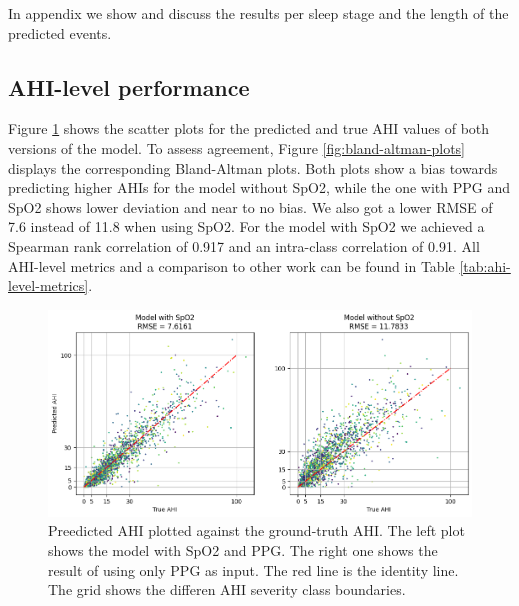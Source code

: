 In appendix  we show and discuss the results per sleep stage and the length of the predicted events.

\subsection*{AHI-level performance}

Figure \ref{fig:ahi-plots} shows the scatter plots for the predicted and true AHI values of both versions of the model. To assess agreement, Figure \ref{fig:bland-altman-plots} displays the corresponding Bland-Altman plots. Both plots show a bias towards predicting higher AHIs for the model without SpO2, while the one with PPG and SpO2 shows lower deviation and near to no bias. We also got a lower RMSE of 7.6 instead of 11.8 when using SpO2.
For the model with SpO2 we achieved a Spearman rank correlation of 0.917 and an intra-class correlation of  0.91.
All AHI-level metrics and a comparison to other work can be found in Table \ref{tab:ahi-level-metrics}.

\begin{figure}
    \centering
    \includegraphics[width=\textwidth]{images/AhiPlots}
    \caption{Preedicted AHI plotted against the ground-truth AHI. The left plot shows the model with SpO2 and PPG. The right one shows the result of using only PPG as input. The red line is the identity line. The grid shows the differen AHI severity class boundaries.}
    \label{fig:ahi-plots}
\end{figure}

